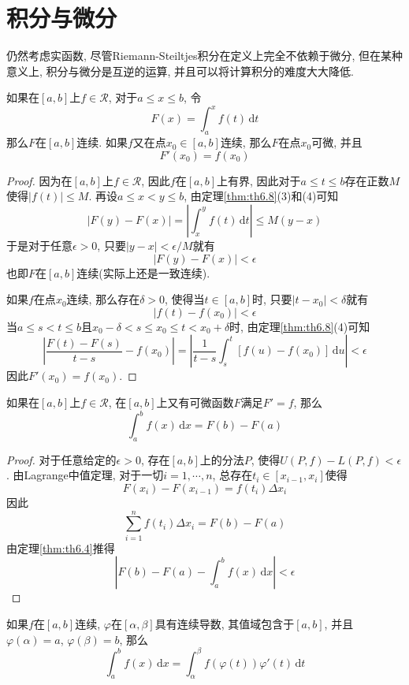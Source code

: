 \documentclass[cn,12pt,math=mtpro2,citestyle=gb7714-2015,bibstyle=gb7714-2015,twocol]{elegantbook}
\newcommand{\dx}{\,\text{d}x}
\newcommand{\dt}{\,\text{d}t}
\begin{document}
\section{积分与微分}
仍然考虑实函数, 尽管Riemann-Steiltjes积分在定义上完全不依赖于微分, 但在某种意义上, 积分与微分是互逆的运算, 并且可以将计算积分的难度大大降低.
\begin{theorem}\label{thm:th6.9}
  如果在$[a,b]$上$f\in\mathscr{R}$, 对于$a\leq x\leq b$, 令
  $$F(x)=\int_{a}^{x}f(t)\dt$$
  那么$F$在$[a,b]$连续. 如果$f$又在点$x_0\in[a,b]$连续, 那么$F$在点$x_0$可微, 并且
  $$F'(x_0)=f(x_0)$$
\end{theorem}
\begin{proof}
  因为在$[a,b]$上$f\in\mathscr{R}$, 因此$f$在$[a,b]$上有界, 因此对于$a\leq t\leq b$存在正数$M$使得$|f(t)|\leq M$. 再设$a\leq x<y\leq b$, 由定理\ref{thm:th6.8}(3)和(4)可知
  $$|F(y)-F(x)|=\left|\int_{x}^{y}f(t)\dt\right|\leq M(y-x)$$
  于是对于任意$\epsilon>0$, 只要$|y-x|<\epsilon/M$就有
  $$|F(y)-F(x)|<\epsilon$$
  也即$F$在$[a,b]$连续(实际上还是一致连续).

  如果$f$在点$x_0$连续, 那么存在$\delta>0$, 使得当$t\in[a,b]$时, 只要$|t-x_0|<\delta$就有
  $$|f(t)-f(x_0)|<\epsilon$$
  当$a\leq s<t\leq b$且$x_0-\delta<s\leq x_0\leq t<x_0+\delta$时, 由定理\ref{thm:th6.8}(4)可知
  $$\left|\frac{F(t)-F(s)}{t-s}-f(x_0)\right|=\left|\frac{1}{t-s}\int_{s}^{t}[f(u)-f(x_0)]\,\text{d}u\right|<\epsilon$$
  因此$F'(x_0)=f(x_0)$.


\end{proof}
\begin{theorem}[微积分基本定理]
  如果在$[a,b]$上$f\in\mathscr{R}$, 在$[a,b]$上又有可微函数$F$满足$F'=f$, 那么
  $$\int_{a}^{b}f(x)\dx=F(b)-F(a)$$
\end{theorem}
\begin{proof}
  对于任意给定的$\epsilon>0$, 存在$[a,b]$上的分法$P$, 使得$U(P,f)-L(P,f)<\epsilon$. 由Lagrange中值定理, 对于一切$i=1,\cdots,n$, 总存在$t_i
  \in[x_{i-1},x_i]$使得
  $$F(x_i)-F(x_{i-1})=f(t_i)\Delta x_i$$
  因此
  $$\sum_{i=1}^{n}f(t_i)\Delta x_i=F(b)-F(a)$$
  由定理\ref{thm:th6.4}推得
  $$\left|F(b)-F(a)-\int_{a}^{b}f(x)\dx\right|<\epsilon$$


\end{proof}
\begin{theorem}[换元积分法]
  如果$f$在$[a,b]$连续, $\varphi$在$[\alpha,\beta]$具有连续导数, 其值域包含于$[a,b]$, 并且$\varphi(\alpha)=a$, $\varphi(\beta)=b$, 那么
  $$\int_{a}^{b}f(x)\dx=\int_{\alpha}^{\beta}f(\varphi(t))\varphi'(t)\dt$$
\end{theorem}
\end{document}
